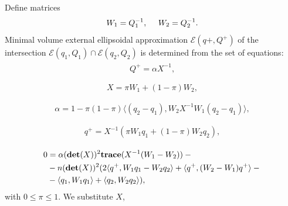 \documentclass[letterpaper,10pt,english]{sphinxmanual}
\begin{document}
Define matrices
\begin{gather}
\begin{split}W_1 = Q_1^{-1}, ~~~~ W_2 = Q_2^{-1} .\label{wmatrices}\end{split}\notag
\end{gather}
Minimal volume external ellipsoidal approximation
\({\mathcal E}(q+,Q^+)\) of the intersection
\({\mathcal E}(q_1,Q_1)\cap{\mathcal E}(q_2,Q_2)\) is determined
from the set of equations:
\label{chap_ellcalc:equation-fusion1}\begin{gather}
\begin{split}Q^+  = \alpha X^{-1}, \\\end{split}\label{chap_ellcalc-fusion1}
\end{gather}\label{chap_ellcalc:equation-fusion2}\begin{gather}
\begin{split}X  =  \pi W_1 + (1-\pi)W_2,\\\end{split}\label{chap_ellcalc-fusion2}
\end{gather}\label{chap_ellcalc:equation-fusion3}\begin{gather}
\begin{split}\alpha  =  1-\pi(1-\pi)\langle(q_2-q_1), W_2X^{-1}W_1(q_2-q_1)\rangle, \\\end{split}\label{chap_ellcalc-fusion3}
\end{gather}\label{chap_ellcalc:equation-fusion4}\begin{gather}
\begin{split}q^+  = X^{-1}(\pi W_1q_1 + (1-\pi)W_2q_2), \\\end{split}\label{chap_ellcalc-fusion4}
\end{gather}\label{chap_ellcalc:equation-fusion5}\begin{gather}
\begin{split}0 &=  \alpha({\bf det}(X))^2{\bf trace}(X^{-1}(W_1-W_2)) - {}\\
  &- n({\bf det}(X))^2 (2\langle q^+,W_1q_1-W_2q_2\rangle + \langle q^+,(W_2-W_1)q^+\rangle - {}\\
  &- \langle q_1,W_1q_1\rangle + \langle q_2,W_2q_2\rangle),\end{split}\label{chap_ellcalc-fusion5}
\end{gather}
with \(0\leqslant\pi\leqslant1\). We substitute \(X\),
\end{document}
